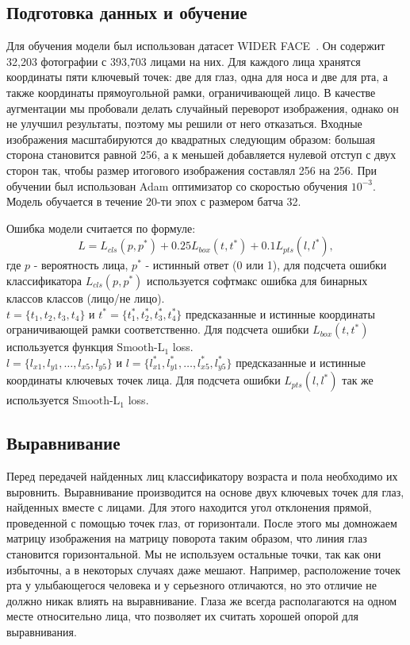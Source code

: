 \subsection{Подготовка данных и обучение}\label{subsec:подготовка-данных-и-обучение}
Для обучения модели был использован датасет WIDER FACE~\cite{wider}.
Он содержит 32,203 фотографии с 393,703 лицами на них.
Для каждого лица хранятся координаты пяти ключевый точек: две для глаз, одна для носа и две для рта,
а также координаты прямоугольной рамки, ограничивающей лицо.
В качестве аугментации мы пробовали делать случайный переворот изображения,
однако он не улучшил результаты, поэтому мы решили от него отказаться.
Входные изображения масштабируются до квадратных следующим образом: большая сторона становится равной 256,
а к меньшей добавляется нулевой отступ с двух сторон так, чтобы размер итогового изображения составлял 256 на 256.
При обучении был использован Adam оптимизатор со скоростью обучения $10^{-3}$.
Модель обучается в течение 20-ти эпох с размером батча 32.
\par Ошибка модели считается по формуле: \[L = L_{cls}(p, p^*) + 0.25 L_{box}(t, t^*) + 0.1 L_{pts}(l, l^*),\]
где $p$ - вероятность лица, $p^*$ - истинный ответ (0 или 1),
для подсчета ошибки классификатора $L_{cls}(p, p^*)$ используется софтмакс ошибка для бинарных классов классов (лицо/не лицо).\\
$t = \{t_1, t_2, t_3, t_4\}$ и $t^* = \{t^*_1, t^*_2, t^*_3, t^*_4\}$ предсказанные и истинные координаты ограничивающей рамки соответственно.
Для подсчета ошибки $L_{box}(t, t^*)$ используется функция $\text{Smooth-L}_1$ loss.
\\$l = \{l_{x1}, l_{y1}, \dots, l_{x5}, l_{y5}\}$ и $l = \{l^*_{x1}, l^*_{y1}, \dots, l^*_{x5}, l^*_{y5}\}$ предсказанные и истинные координаты ключевых точек лица.
Для подсчета ошибки $L_{pts}(l, l^*)$ так же используется $\text{Smooth-L}_1$ loss.

\subsection{Выравнивание}\label{subsec:выравнивание}
Перед передачей найденных лиц классификатору возраста и пола необходимо их выровнить.
Выравнивание производится на основе двух ключевых точек для глаз, найденных вместе с лицами.
Для этого находится угол отклонения прямой, проведенной с помощью точек глаз, от горизонтали.
После этого мы домножаем матрицу изображения на матрицу поворота таким образом, что линия глаз становится горизонтальной.
Мы не используем остальные точки, так как они избыточны, а в некоторых случаях даже мешают.
Например, расположение точек рта у улыбающегося человека и у серьезного отличаются, но это отличие не должно никак влиять на выравнивание.
Глаза же всегда располагаются на одном месте относительно лица, что позволяет их считать хорошей опорой для выравнивания.

